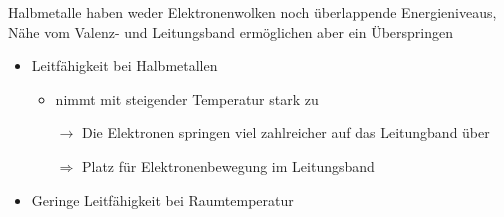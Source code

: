     Halbmetalle haben weder Elektronenwolken noch überlappende Energieniveaus, Nähe vom Valenz- und Leitungsband ermöglichen aber ein Überspringen
    \begin{itemize}
        \item Leitfähigkeit bei Halbmetallen 
        \begin{itemize}
            \item nimmt mit steigender Temperatur stark zu
            
                $\rightarrow$ Die Elektronen springen viel zahlreicher auf das Leitungband über
                
                $\Rightarrow$ Platz für Elektronenbewegung im Leitungsband
        \end{itemize}
        \item Geringe Leitfähigkeit bei Raumtemperatur 
    \end{itemize}

